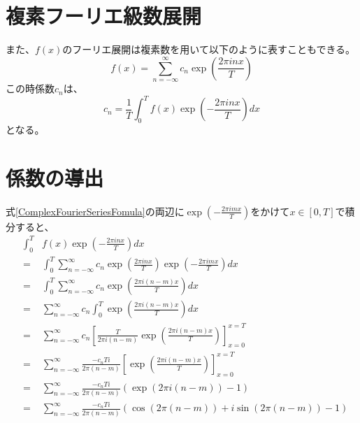 \documentclass[a4paper]{jsarticle}
\begin{document}
\section{複素フーリエ級数展開}
また、$ f \left( x \right) $のフーリエ展開は複素数を用いて以下のように表すこともできる。
\begin{equation}
\label{ComplexFourierSeriesFomula}
f \left( x \right) = \sum _{ n = - \infty } ^\infty c_n \exp \left( \frac { 2 \pi inx } { T } \right)
\end{equation}
この時係数$ c_n $は、
\begin{equation}
c_n = \frac { 1 } { T } \int _0 ^T f \left( x \right) \exp \left( - \frac { 2 \pi inx } { T } \right) dx
\end{equation}
となる。
\section{係数の導出}
式\ref{ComplexFourierSeriesFomula}の両辺に$ \exp \left( - \frac { 2 \pi imx } { T } \right) $をかけて$ x \in \left[ 0,T \right] $で積分すると、
\begin{eqnarray}
	& \int _0 ^T & f \left( x \right) \exp \left( - \frac { 2 \pi inx } { T } \right) dx \nonumber \\
	&=& \int _0 ^T \sum _{ n = - \infty } ^\infty c_n \exp \left( \frac { 2 \pi inx } { T } \right) \exp \left( - \frac { 2 \pi imx } { T } \right) dx \nonumber \\
	&=& \int _0 ^T \sum _{ n = - \infty } ^\infty c_n \exp \left( \frac { 2 \pi i \left( n - m \right) x } { T } \right) dx \nonumber \\
	&=& \sum _{ n = - \infty } ^\infty c_n \int _0 ^T \exp \left( \frac { 2 \pi i \left( n - m \right) x } { T } \right) dx \nonumber \\
	&=& \sum _{ n = - \infty } ^\infty c_n \left[ \frac { T } { 2 \pi i \left( n - m \right) } \exp \left( \frac { 2 \pi i \left( n - m \right) x } { T } \right) \right] _{ x = 0 } ^{ x = T } \nonumber \\
	&=& \sum _{ n = - \infty } ^\infty \frac { -c_nTi } { 2 \pi \left( n - m \right) } \left[ \exp \left( \frac { 2 \pi i \left( n - m \right) x } { T } \right) \right] _{ x = 0 } ^{ x = T } \nonumber \\
	&=& \sum _{ n = - \infty } ^\infty \frac { -c_nTi } { 2 \pi \left( n - m \right) } \left( \exp \left( 2 \pi i \left( n - m \right) \right) - 1 \right) \nonumber \\
	&=& \sum _{ n = - \infty } ^\infty \frac { -c_nTi } { 2 \pi \left( n - m \right) } \left( \cos \left( 2 \pi \left( n - m \right) \right) + i \sin \left( 2 \pi \left( n - m \right) \right) - 1 \right)
\end{eqnarray}
\end{document}
